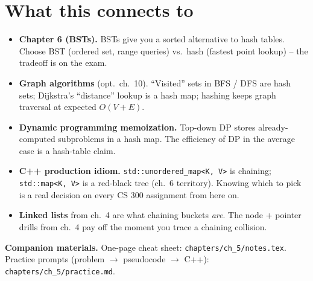 \documentclass[11pt]{article}
\begin{document}
\section*{What this connects to}

\begin{notebox}
\begin{itemize}
    \item \textbf{Chapter 6 (BSTs).} BSTs give you a sorted alternative
    to hash tables. Choose BST (ordered set, range queries) vs.\ hash
    (fastest point lookup) -- the tradeoff is on the exam.
    \item \textbf{Graph algorithms} (opt.\ ch.~10). ``Visited'' sets in
    BFS / DFS are hash sets; Dijkstra's ``distance'' lookup is a hash
    map; hashing keeps graph traversal at expected $O(V + E)$.
    \item \textbf{Dynamic programming memoization.} Top-down DP stores
    already-computed subproblems in a hash map. The efficiency of DP
    in the average case is a hash-table claim.
    \item \textbf{C++ production idiom.}
    \texttt{std::unordered\_map<K, V>} is chaining; \texttt{std::map<K,
    V>} is a red-black tree (ch.~6 territory). Knowing which to pick
    is a real decision on every CS 300 assignment from here on.
    \item \textbf{Linked lists} from ch.~4 are what chaining buckets
    \emph{are}. The node + pointer drills from ch.~4 pay off the moment
    you trace a chaining collision.
\end{itemize}
\end{notebox}

\textbf{Companion materials.} One-page cheat sheet:
\texttt{chapters/ch\_5/notes.tex}. Practice prompts (problem $\to$
pseudocode $\to$ C++): \texttt{chapters/ch\_5/practice.md}.
\end{document}
